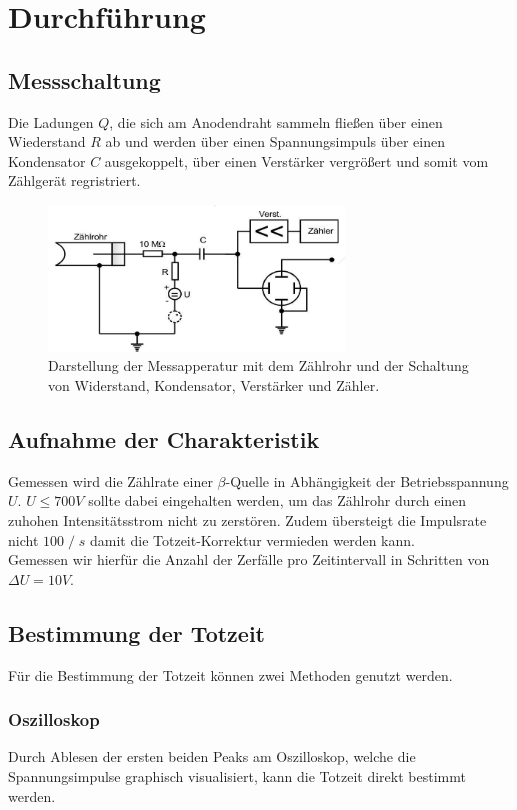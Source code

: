 \newpage
\section{Durchführung}
\subsection{Messschaltung}
Die Ladungen $Q$, die sich am Anodendraht sammeln fließen über einen
Wiederstand $R$ ab und werden über einen Spannungsimpuls über einen Kondensator $C$
ausgekoppelt, über einen Verstärker vergrößert und somit vom Zählgerät regristriert.
\begin{figure}
    \centering
    \includegraphics[width=0.7\textwidth]{input/messapperatur.jpg}
    \caption{Darstellung der Messapperatur mit dem Zählrohr und der Schaltung
    von Widerstand, Kondensator, Verstärker und Zähler.\cite[226]{anleitung}}
\end{figure}

\subsection{Aufnahme der Charakteristik}
Gemessen wird die Zählrate einer $\beta$-Quelle in Abhängigkeit der Betriebsspannung $U$.
$U \leq 700\si{V}$ sollte dabei eingehalten werden, um das Zählrohr durch
einen zuhohen Intensitätsstrom nicht zu zerstören. Zudem übersteigt die Impulsrate nicht $100\;/\;\si{s}$
damit die Totzeit-Korrektur vermieden werden kann.\\
Gemessen wir hierfür die Anzahl der Zerfälle pro Zeitintervall in Schritten von $\Delta U=10\si{V}$.
\subsection{Bestimmung der Totzeit}
Für die Bestimmung der Totzeit können zwei Methoden genutzt werden.
\subsubsection*{Oszilloskop}
Durch Ablesen der ersten beiden Peaks am Oszilloskop, welche die Spannungsimpulse graphisch visualisiert,
kann die Totzeit direkt bestimmt werden.
